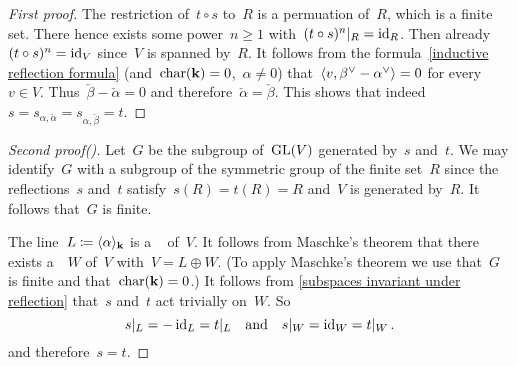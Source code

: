\begin{proof}[First proof]
  
  The restriction of~$t \circ s$ to~$R$ is a permuation of~$R$, which is a finite set.
  There hence exists some power~$n \geq 1$ with~$\restrict{(t \circ s)^n}{R} = \id_{R}$.
  Then already~$(t \circ s)^n = \operatorname{id}_V$ since~$V$ is spanned by~$R$.
  It follows from the formula~\eqref{inductive reflection formula} (and~$\operatorname{char}(\mathbf{k}) = 0$,~$\alpha \neq 0$) that~$\pair{v, \check{\beta} - \check{\alpha}} = 0$ for every~$v \in V$.
  Thus~$\check{\beta} - \check{\alpha} = 0$ and therefore~$\check{\alpha} = \check{\beta}$.
  This shows that indeed~$s = s_{\alpha, \check{\alpha}} = s_{\alpha, \check{\beta}} = t$.
\end{proof}


\begin{proof}[Second proof({\cite[3.7.3.1.4]{winter}})]
  Let~$G$ be the subgroup of~$\operatorname{GL}(V)$ generated by~$s$ and~$t$.
  We may identify~$G$ with a subgroup of the symmetric group of the finite set~$R$ since the reflections~$s$ and~$t$ satisfy~$s(R) = t(R) = R$ and~$V$ is generated by~$R$.
  It follows that~$G$ is finite.
  
  The line~$L \coloneqq \langle\alpha\rangle_{\mathbf{k}}$ is a {\onedimensional}~{} of~$V$.
  It follows from Maschke’s theorem that there exists a~{}~$W$ of~$V$ with~$V = L \oplus W$.
  (To apply Maschke’s theorem we use that~$G$ is finite and that~$\operatorname{char}(\mathbf{k}) = 0$.)
  It follows from \cref{subspaces invariant under reflection} that~$s$ and~$t$ act trivially on~$W$.
  So
  \[
    \restrict{s}{L}
    =
    - \id_L
    =
    \restrict{t}{L}
    \quad\text{and}\quad
    \restrict{s}{W}
    =
    \id_W
    =
    \restrict{t}{W} \,.
  \]
  and therefore~$s = t$.
\end{proof}


